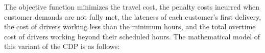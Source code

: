 \documentclass{article}
\begin{document}
The objective function minimizes the travel cost, the penalty costs incurred when customer demands are not fully met, the lateness of each customer's first delivery, the cost of drivers working less than the minimum hours, and the total overtime cost of drivers working beyond their scheduled hours. The mathematical model of this variant of the CDP is as follows:

\end{document}
